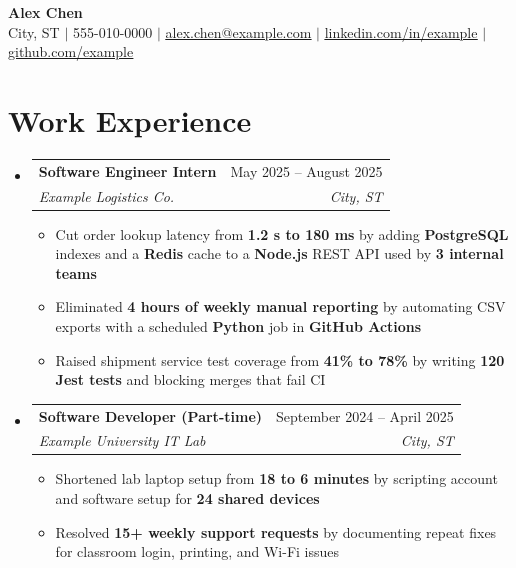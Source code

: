 \documentclass[letterpaper,10pt]{article}
\makeatletter
\newcommand{\resumeItem}[1]{
  \item\small{
    {#1}
  }
}
\newcommand{\resumeSubheading}[4]{
  \vspace{0pt}\item
    \begin{tabular*}{0.97\textwidth}[t]{l@{\extracolsep{\fill}}r}
      \textbf{#1} & #2 \\
      \textit{\small#3} & \textit{\small #4} \\
    \end{tabular*}\vspace{-3pt}
}
\newcommand{\resumeSubHeadingListStart}{\begin{itemize}[leftmargin=0.15in, label={}, topsep=0pt, itemsep=0pt, parsep=0pt, partopsep=0pt]}
\newcommand{\resumeSubHeadingListEnd}{\end{itemize}}
\newcommand{\resumeItemListStart}{\begin{itemize}[leftmargin=0.22in, topsep=4pt, itemsep=1pt, parsep=0pt, partopsep=0pt]}
\newcommand{\resumeItemListEnd}{\end{itemize}\vspace{2pt}}
\makeatother
\begin{document}
\begin{center}
    \textbf{\LARGE Alex Chen} \\ \vspace{1pt}
    \small City, ST $|$ 555-010-0000 $|$
    \href{mailto:alex.chen@example.com}{\underline{alex.chen@example.com}} $|$
    \href{https://www.linkedin.com/in/example}{\underline{linkedin.com/in/example}} $|$
    \href{https://github.com/example}{\underline{github.com/example}}
\end{center}

\section{Work Experience}
  \resumeSubHeadingListStart

\resumeSubheading
      {Software Engineer Intern}{May 2025 -- August 2025}
      {Example Logistics Co.}{City, ST}
      \resumeItemListStart
        \resumeItem{Cut order lookup latency from \textbf{1.2 s to 180 ms} by adding \textbf{PostgreSQL} indexes and a \textbf{Redis} cache to a \textbf{Node.js} REST API used by \textbf{3 internal teams}}
        \resumeItem{Eliminated \textbf{4 hours of weekly manual reporting} by automating CSV exports with a scheduled \textbf{Python} job in \textbf{GitHub Actions}}
        \resumeItem{Raised shipment service test coverage from \textbf{41\% to 78\%} by writing \textbf{120 Jest tests} and blocking merges that fail CI}
      \resumeItemListEnd

\resumeSubheading
      {Software Developer (Part-time)}{September 2024 -- April 2025}
      {Example University IT Lab}{City, ST}
      \resumeItemListStart
        \resumeItem{Shortened lab laptop setup from \textbf{18 to 6 minutes} by scripting account and software setup for \textbf{24 shared devices}}
        \resumeItem{Resolved \textbf{15+ weekly support requests} by documenting repeat fixes for classroom login, printing, and Wi-Fi issues}
      \resumeItemListEnd

\resumeSubHeadingListEnd

\end{document}
